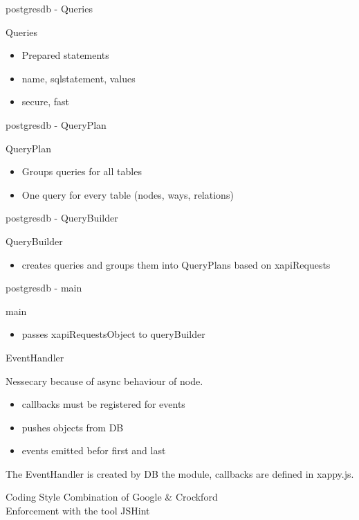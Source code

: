 \documentclass{beamer}
\begin{document}
\begin{frame}{postgresdb - Queries}
    \begin{block}{Queries}
        \begin{itemize}
            \item Prepared statements
            \item name, sqlstatement, values
            \item secure, fast
        \end{itemize}
    \end{block}
\end{frame}
\begin{frame}{postgresdb - QueryPlan}
    \begin{block}{QueryPlan}
        \begin{itemize}
            \item Groups queries for all tables
            \item One query for every table (nodes, ways, relations)
        \end{itemize}
    \end{block}
\end{frame}
\begin{frame}{postgresdb - QueryBuilder}
    \begin{block}{QueryBuilder}
        \begin{itemize}
            \item creates queries and groups them into QueryPlans based on xapiRequests
        \end{itemize}
    \end{block}
\end{frame}
\begin{frame}{postgresdb - main}
    \begin{block}{main}
        \begin{itemize}
            \item passes xapiRequestsObject to queryBuilder
        \end{itemize}
    \end{block}
\end{frame}

\begin{frame}{EventHandler}

    Nessecary because of async behaviour of node.

    \begin{itemize}
        \item callbacks must be registered for events
        \item pushes objects from DB
        \item events emitted befor first and last
    \end{itemize}

    The EventHandler is created by DB the module, callbacks are defined in xappy.js.

\end{frame}


\begin{frame}{Coding Style}
    \normalsize
    Combination of Google \& Crockford\\
    Enforcement with the tool JSHint
\end{frame}
\end{document}

